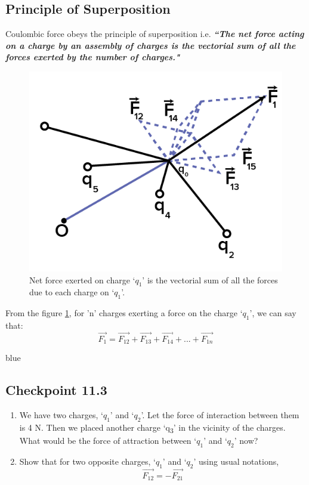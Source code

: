 \subsection{Principle of Superposition}
Coulombic force obeys the principle of superposition i.e. \textit{\textbf{``The net force acting on a charge
by an assembly of charges is the vectorial
sum of all the forces exerted by the number of charges."}}
\begin{figure}[H]
  \centering
  \captionsetup{justification = centering}
  \includegraphics[scale = 1.2]{Images/Chapter-11/11.2.png}
  \caption{Net force exerted  on charge `$q_{1}$' is 
  the vectorial sum of all the forces due to each charge on `$q_{1}$'.}
  \label{fig:11.2}
\end{figure}
From the figure \ref{fig:11.2}, for 'n' charges exerting a
force on the charge `$q_{1}$', we can say that:
\begin{equation}  
  \vec{F_{1}} = \vec{F_{12}} + \vec{F_{13}} + \vec{F_{14}}+...+\vec{F_{1n}} \nonumber
\end{equation}
\begin{mybox}{blue}{}
\subsection*{\checkpoint{} Checkpoint 11.3}
\begin{enumerate}[label=(\alph*)]
  \item We have two charges, `$q_{1}$' and `$q_{2}$'.
  Let the force of interaction between them is 4 N. Then we placed another charge `q\textsubscript{3}' in the vicinity of the charges.
  What would be the force of attraction between `$q_{1}$' and `$q_{2}$' now?
  \item Show that for two opposite charges, `$q_{1}$' and `$q_{2}$' using usual notations,
  \begin{equation}
    \vec{F_{12}} = -\vec{F_{21}} \nonumber
  \end{equation}
\end{enumerate}
\end{mybox}
\newpage
